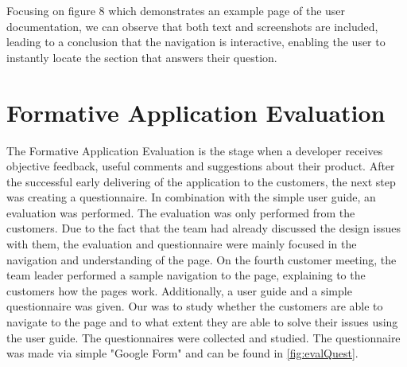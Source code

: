 \documentclass{l3proj}
\begin{document}
Focusing on figure 8 which demonstrates an example page of the user documentation, we can observe that both text and screenshots are included, leading to a conclusion that the navigation is interactive, enabling the user to instantly locate the section that answers their question.

\section{Formative Application Evaluation}
\label{sec:appEval}

The Formative Application Evaluation is the stage when a developer receives objective feedback, useful comments and suggestions about their product.  After the successful early delivering of the application to the customers, the next step was creating a questionnaire. In combination with the simple user guide, an evaluation was performed. The evaluation was only performed from the customers. Due to the fact that the team had already discussed the design issues with them, the evaluation and questionnaire were mainly focused in the navigation and understanding of the page. On the  fourth customer meeting, the team leader performed a sample navigation to the page, explaining to the customers how the pages work.  Additionally, a user guide and a simple questionnaire was given. Our was to study whether the customers are able to navigate to the page and to what extent they are able to solve their issues using the user guide. The questionnaires were collected and studied.  The questionnaire was made via simple "Google Form" and can be found in \autoref{fig:evalQuest}.
\end{document}
